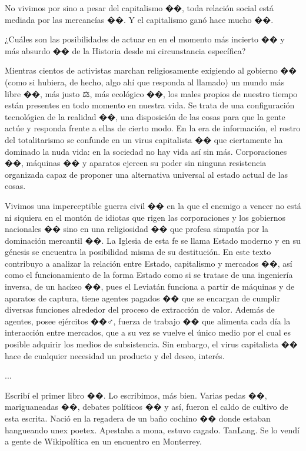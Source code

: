 No vivimos por sino a pesar del capitalismo ��, toda relación social está mediada por las mercancías ��️. Y el capitalismo ganó hace mucho ��.

¿Cuáles son las posibilidades de actuar en en el momento más incierto �� y más absurdo �� de la Historia desde mi circunstancia específica?

Mientras cientos de activistas marchan religiosamente exigiendo al gobierno ��️ (como si hubiera, de hecho, algo ahí que responda al llamado) un mundo más libre ��️, más justo ⚖️, más ecológico ��, los males propios de nuestro tiempo están presentes en todo momento en nuestra vida. Se trata de una configuración tecnológica de la realidad ��️, una disposición de las cosas para que la gente actúe y responda frente a ellas de cierto modo. En la era de información, el rostro del totalitarismo se confunde en un virus capitalista �� que ciertamente ha dominado la nuda vida: en la sociedad no hay vida así sin más. Corporaciones ��, máquinas �� y aparatos ejercen su poder sin ninguna resistencia organizada capaz de proponer una alternativa universal al estado actual de las cosas.

Vivimos una imperceptible guerra civil �� en la que el enemigo a vencer no está ni siquiera en el montón de idiotas que rigen las corporaciones y los gobiernos nacionales �� sino en una religiosidad �� que profesa simpatía por la dominación mercantil ��. La Iglesia de esta fe se llama Estado moderno y en su génesis se encuentra la posibilidad misma de su destitución. En este texto contribuyo a analizar la relación entre Estado, capitalismo y mercados ��, así como el funcionamiento de la forma Estado como si se tratase de una ingeniería inversa, de un hackeo ��️, pues el Leviatán funciona a partir de máquinas y de aparatos de captura, tiene agentes pagados �� que se encargan de cumplir diversas funciones alrededor del proceso de extracción de valor. Además de agentes, posee ejércitos ��‍♂️, fuerza de trabajo �� que alimenta cada día la interacción entre mercados, que a su vez se vuelve el único medio por el cual es posible adquirir los medios de subsistencia. Sin embargo, el virus capitalista �� hace de cualquier necesidad un producto y del deseo, interés.

...

Escribí el primer libro ��. Lo escribimos, más bien. Varias pedas ��, mariguaneadas ��, debates políticos ��️ y así, fueron el caldo de cultivo de esta escrita. Nació en la regadera de un baño cochino �� donde estaban hangueando unex poetex. Apestaba a mona, estuvo cagado. TanLang. Se lo vendí a gente de Wikipolítica en un encuentro en Monterrey.

